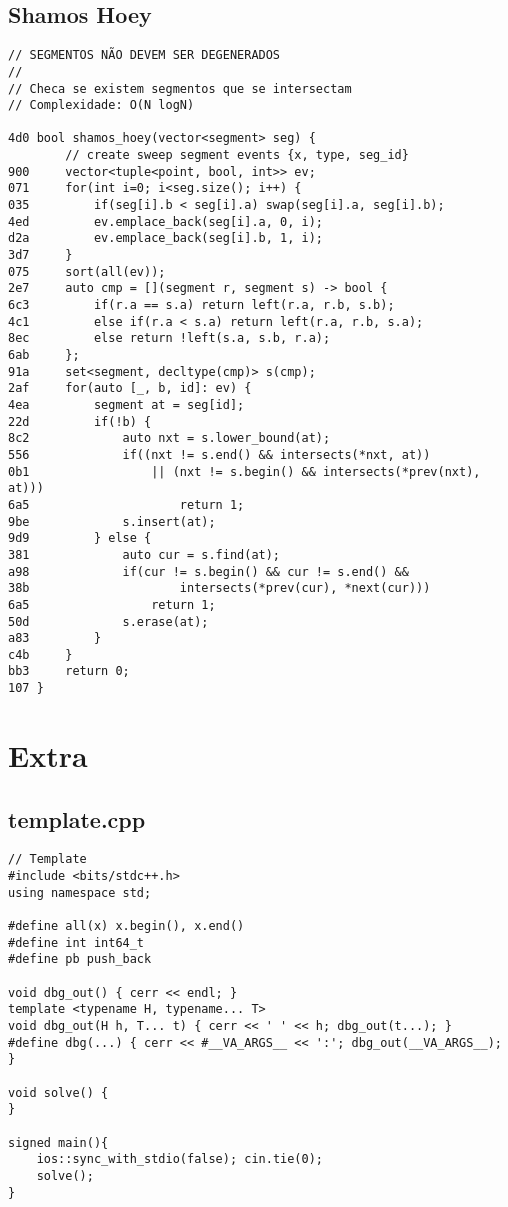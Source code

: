 \documentclass[11pt, a4paper, twoside]{article}
\begin{document}
\subsection{Shamos Hoey}
\begin{lstlisting}
// SEGMENTOS NÃO DEVEM SER DEGENERADOS
//
// Checa se existem segmentos que se intersectam
// Complexidade: O(N logN)

4d0 bool shamos_hoey(vector<segment> seg) {
    	// create sweep segment events {x, type, seg_id}
900 	vector<tuple<point, bool, int>> ev;
071 	for(int i=0; i<seg.size(); i++) {
035 		if(seg[i].b < seg[i].a) swap(seg[i].a, seg[i].b);
4ed 		ev.emplace_back(seg[i].a, 0, i);
d2a 		ev.emplace_back(seg[i].b, 1, i);
3d7 	}
075 	sort(all(ev));
2e7 	auto cmp = [](segment r, segment s) -> bool {
6c3 		if(r.a == s.a) return left(r.a, r.b, s.b);
4c1 		else if(r.a < s.a) return left(r.a, r.b, s.a);
8ec 		else return !left(s.a, s.b, r.a);
6ab 	};
91a 	set<segment, decltype(cmp)> s(cmp);
2af 	for(auto [_, b, id]: ev) {
4ea 		segment at = seg[id];
22d 		if(!b) {
8c2 			auto nxt = s.lower_bound(at);
556 			if((nxt != s.end() && intersects(*nxt, at))
0b1 				|| (nxt != s.begin() && intersects(*prev(nxt), at)))
6a5 					return 1;
9be 			s.insert(at);
9d9 		} else {
381 			auto cur = s.find(at);
a98 			if(cur != s.begin() && cur != s.end() && 
38b 					intersects(*prev(cur), *next(cur))) 
6a5 				return 1;
50d 			s.erase(at);
a83 		}
c4b 	}
bb3 	return 0;
107 }
\end{lstlisting}

\pagebreak


%
%

\section{Extra}

\subsection{template.cpp}
\begin{lstlisting}
// Template
#include <bits/stdc++.h>
using namespace std;

#define all(x) x.begin(), x.end()
#define int int64_t
#define pb push_back

void dbg_out() { cerr << endl; }
template <typename H, typename... T>
void dbg_out(H h, T... t) { cerr << ' ' << h; dbg_out(t...); }
#define dbg(...) { cerr << #__VA_ARGS__ << ':'; dbg_out(__VA_ARGS__); }

void solve() {
}

signed main(){
	ios::sync_with_stdio(false); cin.tie(0);
	solve();
}
\end{lstlisting}
\end{document}
